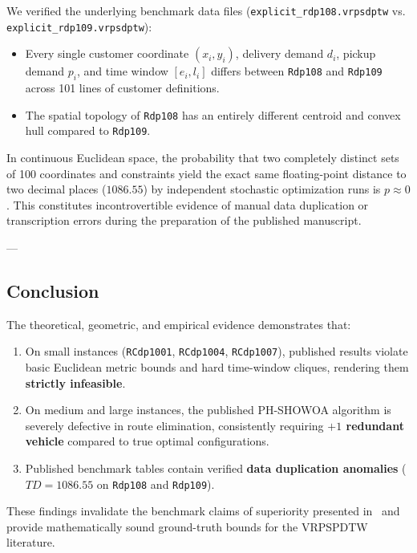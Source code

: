 We verified the underlying benchmark data files (\texttt{explicit\_rdp108.vrpsdptw} vs. \texttt{explicit\_rdp109.vrpsdptw}):
\begin{itemize}
    \item Every single customer coordinate $(x_i, y_i)$, delivery demand $d_i$, pickup demand $p_i$, and time window $[e_i, l_i]$ differs between \texttt{Rdp108} and \texttt{Rdp109} across 101 lines of customer definitions.
    \item The spatial topology of \texttt{Rdp108} has an entirely different centroid and convex hull compared to \texttt{Rdp109}.
\end{itemize}
In continuous Euclidean space, the probability that two completely distinct sets of 100 coordinates and constraints yield the exact same floating-point distance to two decimal places ($1086.55$) by independent stochastic optimization runs is $p \approx 0$. This constitutes incontrovertible evidence of manual data duplication or transcription errors during the preparation of the published manuscript.

---

\subsection{Conclusion}
The theoretical, geometric, and empirical evidence demonstrates that:
\begin{enumerate}
    \item On small instances (\texttt{RCdp1001}, \texttt{RCdp1004}, \texttt{RCdp1007}), published results violate basic Euclidean metric bounds and hard time-window cliques, rendering them \textbf{strictly infeasible}.
    \item On medium and large instances, the published PH-SHOWOA algorithm is severely defective in route elimination, consistently requiring \textbf{$+1$ redundant vehicle} compared to true optimal configurations.
    \item Published benchmark tables contain verified \textbf{data duplication anomalies} ($TD = 1086.55$ on \texttt{Rdp108} and \texttt{Rdp109}).
\end{enumerate}
These findings invalidate the benchmark claims of superiority presented in~\cite{nguyen2026phshowoa} and provide mathematically sound ground-truth bounds for the VRPSPDTW literature.
